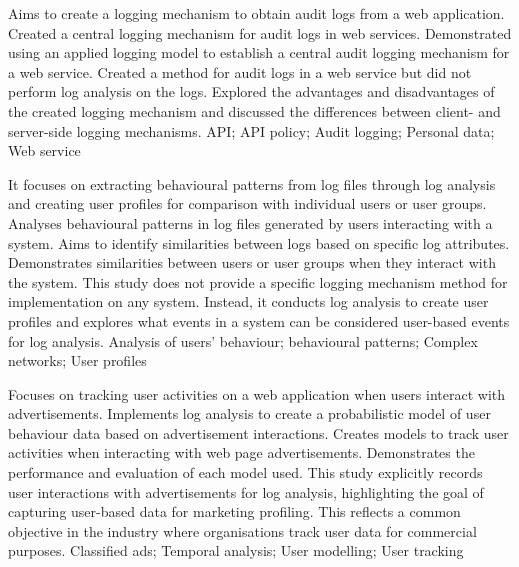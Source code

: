 {
    Aims to create a logging mechanism to obtain audit logs from a web application.
}
{
    Created a central logging mechanism for audit logs in web services.
}
{
    Demonstrated using an applied logging model to establish a central audit logging mechanism for a web service.
}
{
    Created a method for audit logs in a web service but did not perform log analysis on the logs. Explored the advantages and disadvantages of the created logging mechanism and discussed the differences between client- and server-side logging mechanisms.
}
{
    API; API policy; Audit logging; Personal data; Web service
}

{
    It focuses on extracting behavioural patterns from log files through log analysis and creating user profiles for comparison with individual users or user groups.
}
{
    Analyses behavioural patterns in log files generated by users interacting with a system. Aims to identify similarities between logs based on specific log attributes.
}
{
    Demonstrates similarities between users or user groups when they interact with the system.
}
{
    This study does not provide a specific logging mechanism method for implementation on any system. Instead, it conducts log analysis to create user profiles and explores what events in a system can be considered user-based events for log analysis.
}
{
    Analysis of users' behaviour; behavioural patterns; Complex networks; User profiles
}

{
    Focuses on tracking user activities on a web application when users interact with advertisements. Implements log analysis to create a probabilistic model of user behaviour data based on advertisement interactions.
}
{
    Creates models to track user activities when interacting with web page advertisements.
}
{
    Demonstrates the performance and evaluation of each model used.
}
{
    This study explicitly records user interactions with advertisements for log analysis, highlighting the goal of capturing user-based data for marketing profiling. This reflects a common objective in the industry where organisations track user data for commercial purposes.
}
{
    Classified ads; Temporal analysis; User modelling; User tracking
}

